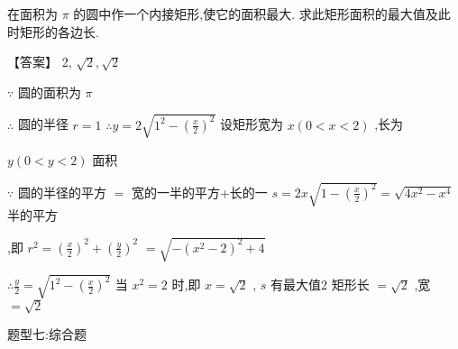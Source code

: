 \documentclass[11pt,a4paper]{article}
\begin{document}
\begin{problem} 
在面积为 \(\displaystyle \pi\) 的圆中作一个内接矩形,使它的面积最大. 求此矩形面积的最大值及此时矩形的各边长.
\begin{jiexi}[55]
【答案】 2, \(\displaystyle \sqrt{2},\sqrt{2}\)

\(\displaystyle \because\) 圆的面积为 \(\displaystyle \pi\)

\(\displaystyle \therefore\) 圆的半径 \(\displaystyle r = 1\)  \(\displaystyle \therefore y = 2\sqrt{{1}^{2} - {\left( \frac{x}{2}\right) }^{2}}\) 设矩形宽为 \(\displaystyle x\left( {0 < x < 2}\right)\) ,长为

\(\displaystyle y\left( {0 < y < 2}\right)\) 面积

\(\displaystyle \because\) 圆的半径的平方 \(\displaystyle =\) 宽的一半的平方+长的一 \(\displaystyle s = {2x}\sqrt{1 - {\left( \frac{x}{2}\right) }^{2}} = \sqrt{4{x}^{2} - {x}^{4}}\) 半的平方

,即 \(\displaystyle {r}^{2} = {\left( \frac{x}{2}\right) }^{2} + {\left( \frac{y}{2}\right) }^{2}\)  \(\displaystyle = \sqrt{-{\left( {x}^{2} - 2\right) }^{2} + 4}\)

\(\displaystyle \therefore \frac{y}{2} = \sqrt{{1}^{2} - {\left( \frac{x}{2}\right) }^{2}}\) 当 \(\displaystyle {x}^{2} = 2\) 时,即 \(\displaystyle x = \sqrt{2}\) , \(\displaystyle s\) 有最大值2 矩形长 \(\displaystyle = \sqrt{2}\) ,宽 \(\displaystyle = \sqrt{2}\)


\end{jiexi}
\end{problem}
\begin{tcolorbox} 
    \centering
题型七:综合题
\end{tcolorbox}
\end{document}
